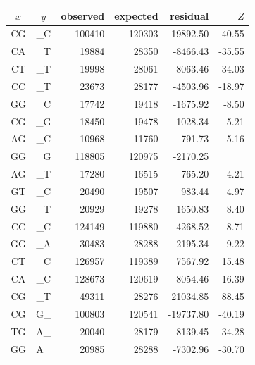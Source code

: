 \documentclass{article}
\newcommand{\nA}{\mbox{A}}  %
\newcommand{\nC}{\mbox{C}}
\newcommand{\nG}{\mbox{G}}
\newcommand{\nT}{\mbox{T}}
\theoremstyle{plain}
\theoremstyle{definition}
\begin{document}
    \begin{center}
        \begin{tabular}{ccrrrr}
                $x$ & $y$ & observed &   expected &    residual &  $Z$ \\
                \hline
                \nC\nG  & \_\nC   & 100410   &  120303    & -19892.50   &	-40.55  \\
                \nC\nA  & \_\nT   &  19884   &   28350    &  -8466.43   &	-35.55  \\
                \nC\nT  & \_\nT   &  19998   &   28061    &  -8063.46   &	-34.03  \\
                \nC\nC  & \_\nT   &  23673   &   28177    &  -4503.96   &	-18.97  \\
                \nG\nG  & \_\nC   &  17742   &   19418    &  -1675.92   &	 -8.50  \\
                \nC\nG  & \_\nG   &  18450   &   19478    &  -1028.34   &	 -5.21  \\
                \nA\nG  & \_\nC   &  10968   &   11760    &   -791.73   &	 -5.16  \\
                \nG\nG  & \_\nG   & 118805   &  120975    &  -2170.25   &    \\
                \hline
                \nA\nG  & \_\nT   &  17280   &   16515    &    765.20   &  4.21   \\
                \nG\nT  & \_\nC   &  20490   &   19507    &    983.44   &  4.97   \\
                \nG\nG  & \_\nT   &  20929   &   19278    &   1650.83   &  8.40   \\
                \nC\nC  & \_\nC   & 124149   &  119880    &   4268.52   &  8.71   \\
                \nG\nG  & \_\nA   &  30483   &   28288    &   2195.34   &  9.22   \\
                \nC\nT  & \_\nC   & 126957   &  119389    &   7567.92   & 15.48   \\
                \nC\nA  & \_\nC   & 128673   &  120619    &   8054.46   & 16.39   \\
                \nC\nG  & \_\nT   &  49311   &   28276    &  21034.85   & 88.45   \\
                \hline
                \hline
                \nC\nG  &  \nG\_  &  100803  &  120541  &  -19737.80  &  -40.19 \\
                \nT\nG  &  \nA\_  &   20040  &   28179  &   -8139.45  &  -34.28 \\
                \nG\nG  &  \nA\_  &   20985  &   28288  &   -7302.96  &  -30.70 \\

\end{tabular}
\end{center}
\end{document}
